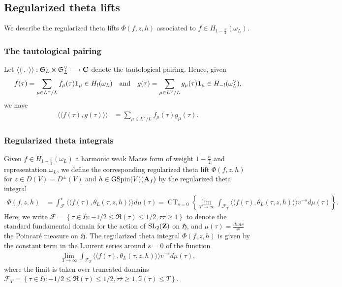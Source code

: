 \documentclass{amsart}
\theoremstyle{definition}
\theoremstyle{definition}
\theoremstyle{definition}
\begin{document}
\subsection{Regularized theta lifts}

We describe the regularized theta lifts $\Phi(f, z, h)$ associated to $f \in H_{1-\frac{n}{2}}(\omega_L)$.

\subsubsection{The tautological pairing} Let $\langle \langle \cdot, \cdot \rangle \rangle: \mathfrak{S}_L \times \mathfrak{S}_L^{\vee} \longrightarrow {\bf{C}}$
denote the tautological pairing. Hence, given
\begin{align*} f(\tau) = \sum\limits_{\mu \in L^{\vee}/L} f_{\mu}(\tau) {\bf{1}}_{\mu} \in H_l(\omega_L) \quad\text{and}\quad
g(\tau) = \sum\limits_{\mu \in L^{\vee}/L} g_{\mu}(\tau) {\bf{1}}_{\mu} \in H_{-l}(\omega_L^{\vee}), \end{align*}
we have
\begin{align*} \langle \langle f(\tau), g(\tau) \rangle \rangle &= \sum\limits_{\mu \in L^{\vee}/L} f_{\mu}(\tau) g_{\mu}(\tau). \end{align*}

\subsubsection{Regularized theta integrals}

Given $f \in H_{1-\frac{n}{2}}(\omega_L)$ a harmonic weak Maass form of weight $1 - \frac{n}{2}$ and representation $\omega_L$, we define the 
corresponding regularized theta lift $\Phi(f, z, h)$ for $z \in D(V) = D^{\pm}(V)$ 
and $h \in \operatorname{GSpin}(V)({\bf{A}}_f)$ by the regularized theta integral 
\begin{align*} \Phi(f, z, h) &= \int_{\mathcal{F}}^{\star} \langle \langle f(\tau), \theta_L(\tau, z, h) \rangle \rangle d \mu(\tau)
= \operatorname{CT}_{s=0} \left\lbrace \lim_{T \rightarrow \infty} \int_{\mathcal{F}_T} 
 \langle \langle f(\tau), \theta_L(\tau, z, h) \rangle \rangle v^{-s} d \mu(\tau) \right\rbrace. \end{align*}
Here, we write $\mathcal{F} = \left\lbrace \tau \in \mathfrak{H}: -1/2 \leq \Re(\tau) \leq 1/2, \tau \overline{\tau} \geq 1 \right\rbrace$ to denote 
the standard fundamental domain for the action of $\operatorname{SL}_2({\bf{Z}})$ on $\mathfrak{H}$, and $\mu(\tau) = \frac{du dv}{v^2}$ 
the Poincar\'e measure on $\mathfrak{H}$. The regularized theta integral $\Phi(f, z, h)$ 
is given by the constant term in the Laurent series around $s=0$ of the function
\begin{align*} \lim_{T \rightarrow \infty} \int_{\mathcal{F}_T} 
\langle \langle f(\tau), \theta_L(\tau, z, h) \rangle \rangle v^{-s} d \mu(\tau), \end{align*}
where the limit is taken over truncated domains 
$\mathcal{F}_T = \left\lbrace \tau \in \mathfrak{H}: -1/2 \leq \Re(\tau) \leq 1/2, \tau \overline{\tau} \geq 1, \Im(\tau) \leq T \right\rbrace$.
\end{document}
